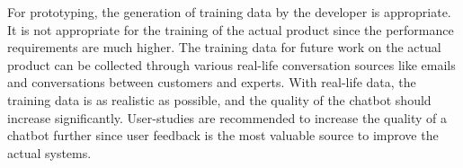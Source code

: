 For prototyping, the generation of training data by the developer is appropriate.
It is not appropriate for the training of the actual product since the performance requirements are much higher.
The training data for future work on the actual product can be collected through various real-life conversation sources like emails and conversations between customers and experts.
With real-life data, the training data is as realistic as possible, and the quality of the chatbot should increase significantly.
User-studies are recommended to increase the quality of a chatbot further since user feedback is the most valuable source to improve the actual systems.